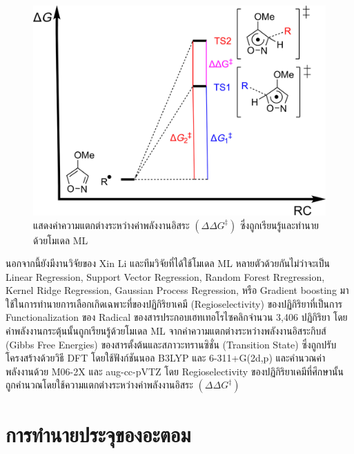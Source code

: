 \begin{figure}[H]
    \centering
    \includegraphics[width=0.75\linewidth]{fig/ml_act_energy_regio.jpg}
    \caption{แสดงค่าความแตกต่างระหว่างค่าพลังงานอิสระ $(\Delta\Delta G^{\ddagger})$ ซึ่งถูกเรียนรู้และทำนายด้วยโมเดล ML}
    \label{fig:ml_act_energy_regio}
\end{figure}

นอกจากนี้ยังมีงานวิจัยของ Xin Li และทีมวิจัยที่ได้ใช้โมเดล ML หลายตัวด้วยกันไม่ว่าจะเป็น Linear Regression, Support Vector Regression, Random Forest Rregression, Kernel Ridge Regression, Gaussian Process Regression, หรือ Gradient boosting มาใช้ในการทำนายการเลือกเกิดเฉพาะที่ของปฏิกิริยาเคมี (Regioselectivity) ของปฏิกิริยาที่เป็นการ Functionalization ของ  Radical ของสารประกอบเฮทเทอโรไซคลิกจำนวน 3,406 ปฏิกิริยา\autocite{li2020} โดยค่าพลังงานกระตุ้นนั้นถูกเรียนรู้ด้วยโมเดล ML จากค่าความแตกต่างระหว่างพลังงานอิสระกิบส์ (Gibbs Free Energies) ของสารตั้งต้นและสภาวะทรานซิชั่น (Transition State) ซึ่งถูกปรับโครงสร้างด้วยวิธี DFT โดยใช้ฟังก์ชันนอล B3LYP และ 6-311+G(2d,p) และคำนวณค่าพลังงานด้วย M06-2X และ aug-cc-pVTZ โดย Regioselectivity ของปฏิกิริยาเคมีที่ศึกษานั้นถูกคำนวณโดยใช้ความแตกต่างระหว่างค่าพลังงานอิสระ $(\Delta\Delta G^{\ddagger})$

\section{การทำนายประจุของอะตอม}
\label{sec:pred_atomic_charge}

